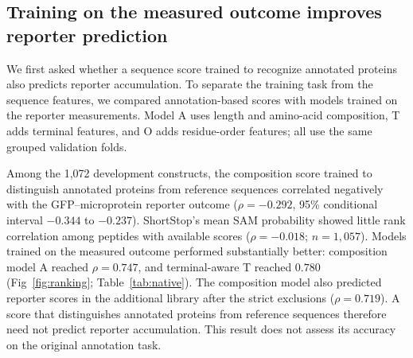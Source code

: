 \documentclass[11pt,a4paper]{article}
\begin{document}
\subsection{Training on the measured outcome improves reporter prediction}
We first asked whether a sequence score trained to recognize annotated
proteins also predicts reporter accumulation. To separate the training task
from the sequence features, we compared annotation-based scores with models
trained on the reporter measurements. Model A uses length and amino-acid
composition, T adds terminal features, and O adds residue-order features;
all use the same grouped validation folds.

Among the 1,072 development constructs, the composition score trained to
distinguish annotated proteins from reference sequences correlated
negatively with the GFP--microprotein reporter outcome ($\rho=-0.292$, 95\% conditional interval $-0.344$ to $-0.237$).
ShortStop's mean SAM probability showed little rank correlation among peptides with available scores ($\rho=-0.018$; $n=1,057$). Models trained on the measured outcome
performed substantially better: composition model A reached $\rho=0.747$,
and terminal-aware T reached $0.780$ (Fig~\ref{fig:ranking};
Table~\ref{tab:native}). The composition model also predicted reporter scores in the additional library after the strict exclusions ($\rho=0.719$).
A score that distinguishes annotated proteins from reference sequences therefore need not predict reporter accumulation. This result does not assess its accuracy on the original annotation task.
\end{document}
